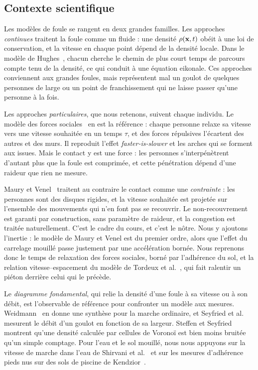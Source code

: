 \subsection{Contexte scientifique}

Les modèles de foule se rangent en deux grandes familles. Les approches
\emph{continues} traitent la foule comme un fluide : une densité $\rho(\mathbf{x},t)$
obéit à une loi de conservation, et la vitesse en chaque point dépend de la
densité locale. Dans le modèle de Hughes~\cite{hughes2002}, chacun cherche le
chemin de plus court temps de parcours compte tenu de la densité, ce qui conduit
à une équation eikonale. Ces approches conviennent aux grandes foules, mais
représentent mal un goulot de quelques personnes de large ou un point de
franchissement qui ne laisse passer qu'une personne à la fois.

Les approches \emph{particulaires}, que nous retenons, suivent chaque individu.
Le modèle des forces sociales~\cite{helbing1995,helbing2000} en est la référence :
chaque personne relaxe sa vitesse vers une vitesse souhaitée en un temps
$\tau$, et des forces répulsives l'écartent des autres et des murs. Il
reproduit l'effet \emph{faster-is-slower} et les arches qui se forment aux
issues. Mais le contact y est une force : les personnes s'interpénètrent d'autant
plus que la foule est comprimée, et cette pénétration dépend d'une raideur que
rien ne mesure.

Maury et Venel~\cite{maury2008,maury2011} traitent au contraire le contact comme
une \emph{contrainte} : les personnes sont des disques rigides, et la vitesse
souhaitée est projetée sur l'ensemble des mouvements qui n'en font pas se
recouvrir. Le non-recouvrement est garanti par construction, sans paramètre de
raideur, et la congestion est traitée naturellement. C'est le cadre du cours,
et c'est le nôtre. Nous y ajoutons l'inertie : le modèle de Maury et Venel est
du premier ordre, alors que l'effet du carrelage mouillé passe justement par
une accélération bornée. Nous reprenons donc le temps de relaxation des forces
sociales, borné par l'adhérence du sol, et la relation vitesse--espacement du
modèle de Tordeux et al.~\cite{tordeux2016}, qui fait ralentir un piéton
derrière celui qui le précède.

Le \emph{diagramme fondamental}, qui relie la densité d'une foule à sa vitesse
ou à son débit, est l'observable de référence pour confronter un modèle aux
mesures. Weidmann~\cite{weidmann1993} en donne une synthèse pour la marche
ordinaire, et Seyfried et al.~\cite{seyfried2009} mesurent le débit d'un goulot
en fonction de sa largeur. Steffen et Seyfried~\cite{steffen2010} montrent qu'une
densité calculée par cellules de Voronoï est bien moins bruitée qu'un simple
comptage. Pour l'eau et le sol mouillé, nous nous appuyons sur la vitesse de
marche dans l'eau de Shirvani et al.~\cite{shirvani2020} et sur les mesures
d'adhérence pieds nus sur des sols de piscine de Kendzior~\cite{kendzior2023}.

